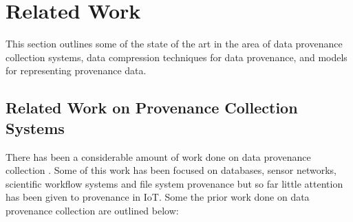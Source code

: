 


\chapter{Related Work}\label{background}

This section outlines some of the state of the art in the area of data provenance collection systems, data compression techniques for data provenance, and models for representing provenance data.


\section{Related Work on Provenance Collection Systems}

There has been a considerable amount of work done on data provenance collection \cite{_general-purpose_2012, bates_trustworthy_2015, gessiou_towards_2012, muniswamy_reddy_provenance_2010, }. Some of this work has been focused on databases, sensor networks, scientific workflow systems and file system provenance but so far little attention has been given to provenance in IoT. Some the prior work done on data provenance collection are outlined below:

